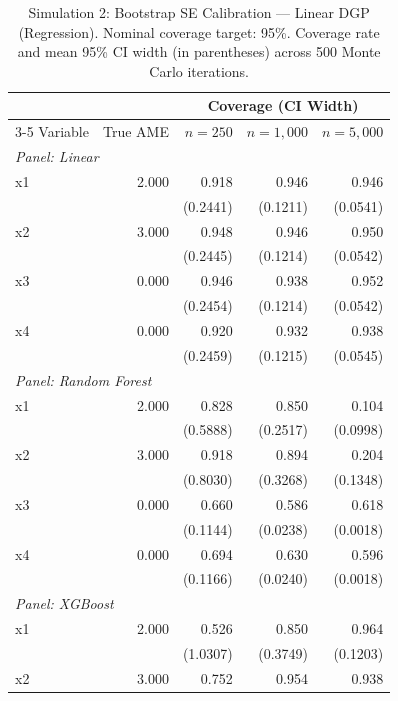 \documentclass[12pt]{article}
\begin{document}
	\begin{table}[htbp]
		\centering
		\footnotesize
		\begin{threeparttable}
			\caption{Simulation 2: Bootstrap SE Calibration --- Linear DGP (Regression). Nominal coverage target: 95\%. Coverage rate and mean 95\% CI width (in parentheses) across 500 Monte Carlo iterations.}
			\label{tab:sim2_calibration_regression_linear}
			\begin{tabular}{lrrrr}
				\toprule
				& & \multicolumn{3}{c}{Coverage (CI Width)} \\
				\cmidrule(lr){3-5}
				Variable & True AME & $n=250$ & $n=1,000$ & $n=5,000$ \\
				\midrule
				\multicolumn{5}{l}{\textit{Panel: Linear}} \\
				\quad x1 & 2.000 & 0.918 & 0.946 & 0.946 \\
				&  & (0.2441) & (0.1211) & (0.0541) \\
				\quad x2 & 3.000 & 0.948 & 0.946 & 0.950 \\
				&  & (0.2445) & (0.1214) & (0.0542) \\
				\quad x3 & 0.000 & 0.946 & 0.938 & 0.952 \\
				&  & (0.2454) & (0.1214) & (0.0542) \\
				\quad x4 & 0.000 & 0.920 & 0.932 & 0.938 \\
				&  & (0.2459) & (0.1215) & (0.0545) \\
				\midrule
				\multicolumn{5}{l}{\textit{Panel: Random Forest}} \\
				\quad x1 & 2.000 & 0.828 & 0.850 & 0.104 \\
				&  & (0.5888) & (0.2517) & (0.0998) \\
				\quad x2 & 3.000 & 0.918 & 0.894 & 0.204 \\
				&  & (0.8030) & (0.3268) & (0.1348) \\
				\quad x3 & 0.000 & 0.660 & 0.586 & 0.618 \\
				&  & (0.1144) & (0.0238) & (0.0018) \\
				\quad x4 & 0.000 & 0.694 & 0.630 & 0.596 \\
				&  & (0.1166) & (0.0240) & (0.0018) \\
				\midrule
				\multicolumn{5}{l}{\textit{Panel: XGBoost}} \\
				\quad x1 & 2.000 & 0.526 & 0.850 & 0.964 \\
				&  & (1.0307) & (0.3749) & (0.1203) \\
				\quad x2 & 3.000 & 0.752 & 0.954 & 0.938 \\

\end{tabular}
\end{threeparttable}
\end{table}
\end{document}
